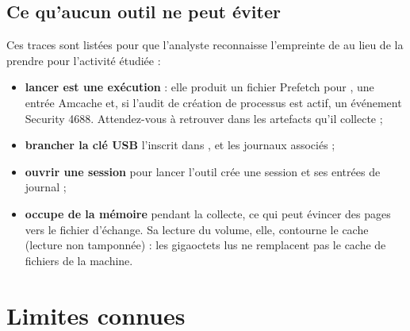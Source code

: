 \documentclass[11pt,a4paper,oneside]{report}
\begin{document}
\section{Ce qu'aucun outil ne peut éviter}

Ces traces sont listées pour que l'analyste reconnaisse l'empreinte de \wac{} au
lieu de la prendre pour l'activité étudiée :

\begin{itemize}
  \item \textbf{lancer  est une exécution} : elle produit un
        fichier Prefetch pour , une entrée Amcache et, si
        l'audit de création de processus est actif, un événement Security 4688.
        Attendez-vous à retrouver \wac{} dans les artefacts qu'il collecte ;
  \item \textbf{brancher la clé USB} l'inscrit dans ,
         et les journaux associés ;
  \item \textbf{ouvrir une session} pour lancer l'outil crée une session et ses
        entrées de journal ;
  \item \wac{} \textbf{occupe de la mémoire} pendant la collecte, ce qui peut
        évincer des pages vers le fichier d'échange. Sa lecture du volume, elle,
        contourne le cache (lecture non tamponnée) : les gigaoctets lus ne
        remplacent pas le cache de fichiers de la machine.
\end{itemize}

\chapter{Limites connues}
\end{document}
